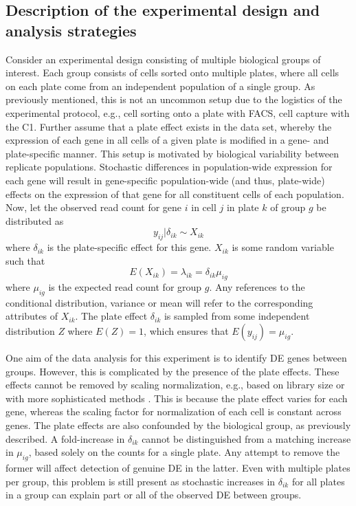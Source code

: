\documentclass[oupdraft]{bio}
\begin{document}
\subsection{Description of the experimental design and analysis strategies}
Consider an experimental design consisting of multiple biological groups of interest.
Each group consists of cells sorted onto multiple plates, where all cells on each plate come from an independent population of a single group.
As previously mentioned, this is not an uncommon setup due to the logistics of the experimental protocol, e.g., cell sorting onto a plate with FACS, cell capture with the C1.
Further assume that a plate effect exists in the data set, whereby the expression of each gene in all cells of a given plate is modified in a gene- and plate-specific manner.
This setup is motivated by biological variability between replicate populations.
Stochastic differences in population-wide expression for each gene will result in gene-specific population-wide (and thus, plate-wide) effects on the expression of that gene for all constituent cells of each population.
Now, let the observed read count for gene $i$ in cell $j$ in plate $k$ of group $g$ be distributed as 
\[
    y_{ij} | \delta_{ik}  \sim X_{ik}
\]
where $\delta_{ik}$ is the plate-specific effect for this gene.
$X_{ik}$ is some random variable such that 
\[
    E(X_{ik}) = \lambda_{ik} = \delta_{ik}\mu_{ig}
\]
where $\mu_{ig}$ is the expected read count for group $g$. 
Any references to the conditional distribution, variance or mean will refer to the corresponding attributes of $X_{ik}$.
The plate effect $\delta_{ik}$ is sampled from some independent distribution $Z$ where $E(Z) = 1$, which ensures that $E(y_{ij}) = \mu_{ig}$.


One aim of the data analysis for this experiment is to identify DE genes between groups.
However, this is complicated by the presence of the plate effects.
These effects cannot be removed by scaling normalization, e.g., based on library size or with more sophisticated methods \citep{anders2010differential,robinson2010scaling}.
This is because the plate effect varies for each gene, whereas the scaling factor for normalization of each cell is constant across genes.
The plate effects are also confounded by the biological group, as previously described.
A fold-increase in $\delta_{ik}$ cannot be distinguished from a matching increase in $\mu_{ig}$, based solely on the counts for a single plate.
Any attempt to remove the former will affect detection of genuine DE in the latter.
Even with multiple plates per group, this problem is still present as stochastic increases in $\delta_{ik}$ for all plates in a group can explain part or all of the observed DE between groups.
\end{document}
